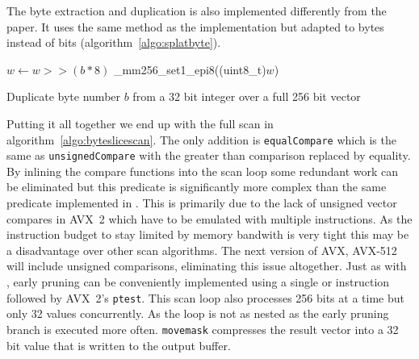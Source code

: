 The byte extraction and duplication is also implemented differently from the
paper. It uses the same method as the \bwv{} implementation but adapted to bytes
instead of bits (algorithm~\ref{algo:splatbyte}).

\begin{algorithm}[h]
\begin{algorithmic}[1]
  \State $w \gets w >> (b * 8)$ 
  \State \Return \_mm256\_set1\_epi8((uint8\_t)$w$) 
  \EndProcedure
\end{algorithmic}
\caption{Duplicate byte number $b$ from a 32 bit integer over a full 256 bit vector}
\label{algo:splatbyte}
\end{algorithm}

Putting it all together we end up with the full scan in
algorithm~\ref{algo:byteslicescan}. The only addition is \texttt{equalCompare}
which is the same as \texttt{unsignedCompare} with the greater than comparison
replaced by equality. By inlining the compare functions into the scan loop some
redundant work can be eliminated but this predicate is significantly more
complex than the same predicate implemented in \bwv{}. This is primarily due to
the lack of unsigned vector compares in AVX~2 which have to be emulated with
multiple instructions. As the instruction budget to stay limited by memory
bandwith is very tight this may be a disadvantage over other scan algorithms.
The next version of AVX, AVX-512 will include unsigned comparisons, eliminating
this issue altogether. Just as with \bwv{}, early pruning can be conveniently
implemented using a single or instruction followed by AVX~2's \texttt{ptest}.
This scan loop also processes 256 bits at a time but only 32 values
concurrently. As the loop is not as nested as \bwv{} the early pruning branch is
executed more often. \texttt{movemask} compresses the result vector into a 32
bit value that is written to the output buffer.

